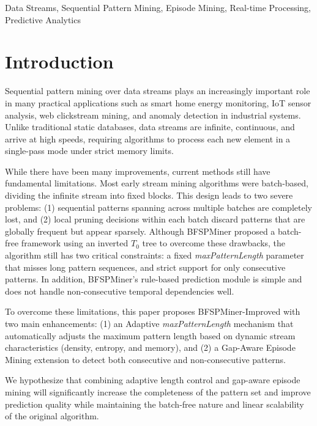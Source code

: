 \documentclass[conference]{IEEEtran}
\begin{document}
\begin{IEEEkeywords}
Data Streams, Sequential Pattern Mining, Episode Mining, Real-time Processing, Predictive Analytics
\end{IEEEkeywords}

\section{Introduction}
\label{sec:intro}

Sequential pattern mining over data streams plays an increasingly important role in many practical applications such as smart home energy monitoring, IoT sensor analysis, web clickstream mining, and anomaly detection in industrial systems. Unlike traditional static databases, data streams are infinite, continuous, and arrive at high speeds, requiring algorithms to process each new element in a single-pass mode under strict memory limits.

While there have been many improvements, current methods still have fundamental limitations. Most early stream mining algorithms were batch-based, dividing the infinite stream into fixed blocks. This design leads to two severe problems: (1) sequential patterns spanning across multiple batches are completely lost, and (2) local pruning decisions within each batch discard patterns that are globally frequent but appear sparsely. Although BFSPMiner \cite{hassani2019} proposed a batch-free framework using an inverted $T_0$ tree to overcome these drawbacks, the algorithm still has two critical constraints: a fixed \textit{maxPatternLength} parameter that misses long pattern sequences, and strict support for only consecutive patterns. In addition, BFSPMiner's rule-based prediction module is simple and does not handle non-consecutive temporal dependencies well.

To overcome these limitations, this paper proposes BFSPMiner-Improved with two main enhancements: (1) an Adaptive \textit{maxPatternLength} mechanism that automatically adjusts the maximum pattern length based on dynamic stream characteristics (density, entropy, and memory), and (2) a Gap-Aware Episode Mining extension to detect both consecutive and non-consecutive patterns.

We hypothesize that combining adaptive length control and gap-aware episode mining will significantly increase the completeness of the pattern set and improve prediction quality while maintaining the batch-free nature and linear scalability of the original algorithm.
\end{document}
